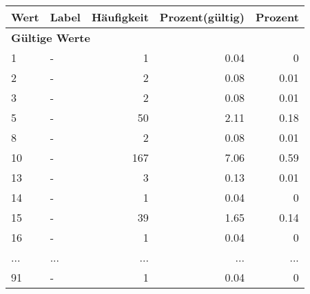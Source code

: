      \begin{longtable}{lXrrr}
     \toprule
     \textbf{Wert} & \textbf{Label} & \textbf{Häufigkeit} & \textbf{Prozent(gültig)} & \textbf{Prozent} \\
     \endhead
     \midrule
     \multicolumn{5}{l}{\textbf{Gültige Werte}}\\
        1 & \multicolumn{1}{X}{-} & %
          \num{1} &
          \num[round-mode=places,round-precision=2]{0,04} &
          \num[round-mode=places,round-precision=2]{0} \\
        2 & \multicolumn{1}{X}{-} & %
          \num{2} &
          \num[round-mode=places,round-precision=2]{0,08} &
          \num[round-mode=places,round-precision=2]{0,01} \\
        3 & \multicolumn{1}{X}{-} & %
          \num{2} &
          \num[round-mode=places,round-precision=2]{0,08} &
          \num[round-mode=places,round-precision=2]{0,01} \\
        5 & \multicolumn{1}{X}{-} & %
          \num{50} &
          \num[round-mode=places,round-precision=2]{2,11} &
          \num[round-mode=places,round-precision=2]{0,18} \\
        8 & \multicolumn{1}{X}{-} & %
          \num{2} &
          \num[round-mode=places,round-precision=2]{0,08} &
          \num[round-mode=places,round-precision=2]{0,01} \\
        10 & \multicolumn{1}{X}{-} & %
          \num{167} &
          \num[round-mode=places,round-precision=2]{7,06} &
          \num[round-mode=places,round-precision=2]{0,59} \\
        13 & \multicolumn{1}{X}{-} & %
          \num{3} &
          \num[round-mode=places,round-precision=2]{0,13} &
          \num[round-mode=places,round-precision=2]{0,01} \\
        14 & \multicolumn{1}{X}{-} & %
          \num{1} &
          \num[round-mode=places,round-precision=2]{0,04} &
          \num[round-mode=places,round-precision=2]{0} \\
        15 & \multicolumn{1}{X}{-} & %
          \num{39} &
          \num[round-mode=places,round-precision=2]{1,65} &
          \num[round-mode=places,round-precision=2]{0,14} \\
        16 & \multicolumn{1}{X}{-} & %
          \num{1} &
          \num[round-mode=places,round-precision=2]{0,04} &
          \num[round-mode=places,round-precision=2]{0} \\
       ... & ... & ... & ... & ... \\
        91 & \multicolumn{1}{X}{-} & %
          \num{1} &
          \num[round-mode=places,round-precision=2]{0,04} &
          \num[round-mode=places,round-precision=2]{0} \\


\end{longtable}

